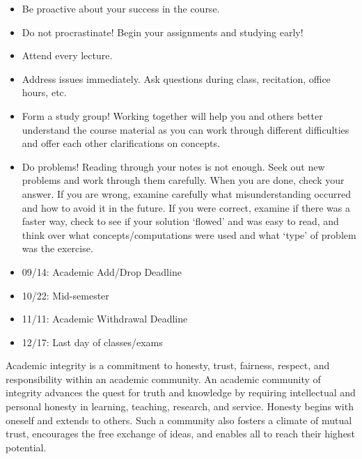 \documentclass[11pt,letterpaper]{article}
\begin{document}
\begin{itemize} \itemsep=0.3ex
\item Be proactive about your success in the course.
\item Do not procrastinate! Begin your assignments and studying early!
\item Attend every lecture.
\item Address issues immediately. Ask questions during class, recitation, office hours, etc. 
\item Form a study group! Working together will help you and others better understand the course material as you can work through different difficulties and offer each other clarifications on concepts.
\item Do problems! Reading through your notes is not enough. Seek out new problems and work through them carefully. When you are done, check your answer. If you are wrong, examine carefully what misunderstanding occurred and how to avoid it in the future. If you were correct, examine if there was a faster way, check to see if your solution `flowed' and was easy to read, and think over what concepts/computations were used and what `type' of problem was the exercise.
\end{itemize}
\sectionbreak



\begin{itemize} \itemsep=0.3ex
\item 09/14: Academic Add/Drop Deadline
\item 10/22: Mid-semester
\item 11/11: Academic Withdrawal Deadline
\item 12/17: Last day of classes/exams
\end{itemize}
\sectionbreak








Academic integrity is a commitment to honesty, trust, fairness, respect, and responsibility within an academic community. An academic community of integrity advances the quest for truth and knowledge by requiring intellectual and personal honesty in learning, teaching, research, and service. Honesty begins with oneself and extends to others. Such a community also fosters a climate of mutual trust, encourages the free exchange of ideas, and enables all to reach their highest potential. \pspace
\end{document}
